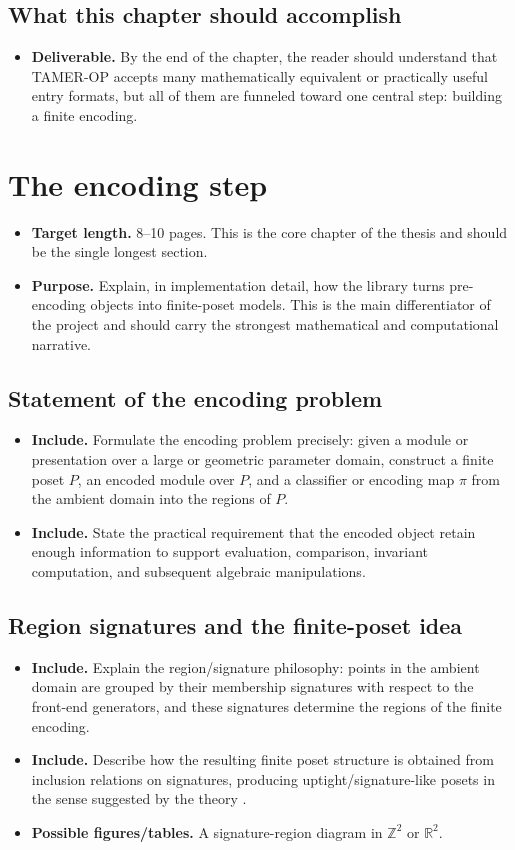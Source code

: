 \documentclass[11pt]{article}
\newcommand{\TAMER}{\textsc{TAMER-OP}}
\newenvironment{plan}{\begin{itemize}[leftmargin=1.6em,itemsep=0.35em,topsep=0.25em]}{\end{itemize}}
\newcommand{\target}[1]{\item \textbf{Target length.} #1}
\newcommand{\purpose}[1]{\item \textbf{Purpose.} #1}
\newcommand{\includeitems}[1]{\item \textbf{Include.} #1}
\newcommand{\deliverable}[1]{\item \textbf{Deliverable.} #1}
\newcommand{\figures}[1]{\item \textbf{Possible figures/tables.} #1}
\begin{document}
\subsection{What this chapter should accomplish}

\begin{plan}
    \deliverable{By the end of the chapter, the reader should understand that \TAMER{} accepts many mathematically equivalent or practically useful entry formats, but all of them are funneled toward one central step: building a finite encoding.}
\end{plan}

\section{The encoding step}\label{sec:encoding}

\begin{plan}
    \target{8--10 pages. This is the core chapter of the thesis and should be the single longest section.}
    \purpose{Explain, in implementation detail, how the library turns pre-encoding objects into finite-poset models. This is the main differentiator of the project and should carry the strongest mathematical and computational narrative.}
\end{plan}

\subsection{Statement of the encoding problem}

\begin{plan}
    \includeitems{Formulate the encoding problem precisely: given a module or presentation over a large or geometric parameter domain, construct a finite poset $P$, an encoded module over $P$, and a classifier or encoding map $\pi$ from the ambient domain into the regions of $P$.}
    \includeitems{State the practical requirement that the encoded object retain enough information to support evaluation, comparison, invariant computation, and subsequent algebraic manipulations.}
\end{plan}

\subsection{Region signatures and the finite-poset idea}

\begin{plan}
    \includeitems{Explain the region/signature philosophy: points in the ambient domain are grouped by their membership signatures with respect to the front-end generators, and these signatures determine the regions of the finite encoding.}
    \includeitems{Describe how the resulting finite poset structure is obtained from inclusion relations on signatures, producing uptight/signature-like posets in the sense suggested by the theory \cite{Mil20}.}
    \figures{A signature-region diagram in $\mathbb{Z}^2$ or $\mathbb{R}^2$.}
\end{plan}
\end{document}
